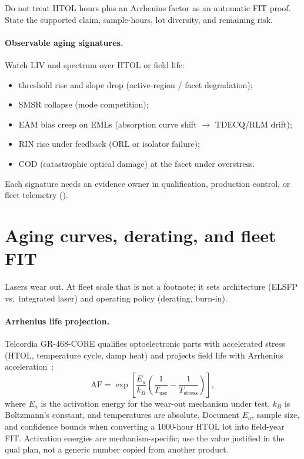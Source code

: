 Do not treat HTOL hours plus an Arrhenius factor as an automatic FIT proof. State
the supported claim, sample-hours, lot diversity, and remaining risk.

\paragraph{Observable aging signatures.}
Watch LIV and spectrum over HTOL or field life:
\begin{itemize}
\item threshold rise and slope drop (active-region / facet degradation);
\item SMSR collapse (mode competition);
\item EAM bias creep on EMLs (absorption curve shift $\to$ TDECQ/RLM drift);
\item RIN rise under feedback (ORL or isolator failure);
\item COD (catastrophic optical damage) at the facet under overstress.
\end{itemize}
Each signature needs an evidence owner in qualification, production control, or
fleet telemetry ().

\section{Aging curves, derating, and fleet FIT}
\label{sec:laser-aging}

Lasers wear out. At fleet scale that is not a footnote; it sets architecture
(ELSFP vs.\ integrated laser) and operating policy (derating, burn-in).


\paragraph{Arrhenius life projection.}
 Telcordia GR-468-CORE qualifies optoelectronic parts with
accelerated stress (HTOL, temperature cycle, damp heat) and projects field life
with Arrhenius acceleration~:
\[
\mathrm{AF}
= \exp\!\left[\frac{E_a}{k_B}\left(\frac{1}{T_\mathrm{use}}-\frac{1}{T_\mathrm{stress}}\right)\right],
\]
where $E_a$ is the activation energy for the wear-out mechanism under test, $k_B$
is Boltzmann's constant, and temperatures are absolute. Document $E_a$, sample
size, and confidence bounds when converting a 1000-hour HTOL lot into field-year
FIT. Activation energies are mechanism-specific; use the value justified in the
qual plan, not a generic number copied from another product.

